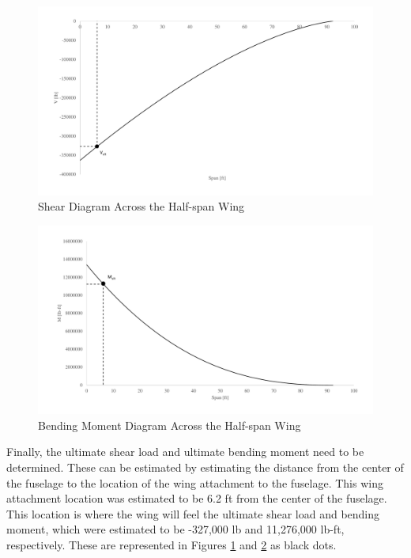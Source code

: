 \begin{figure}[H]
    \centering
    \includegraphics[width=1.0\linewidth]{Photos/Shear.pdf}
    \caption{Shear Diagram Across the Half-span Wing}
    \label{sheardiag}
\end{figure}

\begin{figure}[H]
    \centering
    \includegraphics[width=1.0\linewidth]{Photos/Moment.pdf}
    \caption{Bending Moment Diagram Across the Half-span Wing}
    \label{momentdiag}
\end{figure}

\clearpage
Finally, the ultimate shear load and ultimate bending moment need to be determined. These can be estimated by estimating the distance from the center of the fuselage to the location of the wing attachment to the fuselage. This wing attachment location was estimated to be 6.2 ft from the center of the fuselage. This location is where the wing will feel the ultimate shear load and bending moment, which were estimated to be -327,000 lb and 11,276,000 lb-ft, respectively. These are represented in Figures \ref{sheardiag} and \ref{momentdiag} as black dots. 

